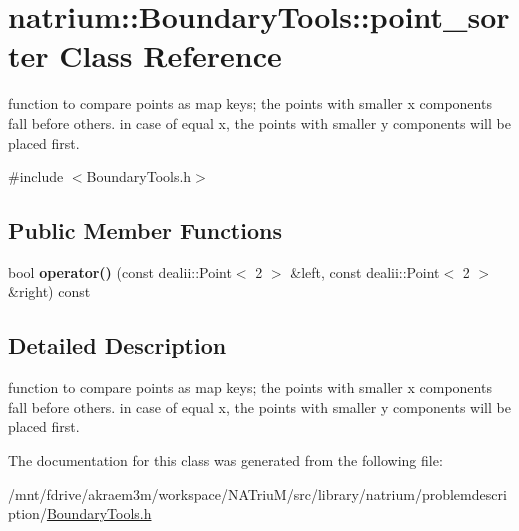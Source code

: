 \hypertarget{classnatrium_1_1BoundaryTools_1_1point__sorter}{
\section{natrium::BoundaryTools::point\_\-sorter Class Reference}
\label{classnatrium_1_1BoundaryTools_1_1point__sorter}
}


function to compare points as map keys; the points with smaller x components fall before others. in case of equal x, the points with smaller y components will be placed first.  


{\ttfamily \#include $<$BoundaryTools.h$>$}\subsection*{Public Member Functions}
\begin{DoxyCompactItemize}
\item 
\hypertarget{classnatrium_1_1BoundaryTools_1_1point__sorter_a38c2278eecae87f9a7350a78234b0433}{
bool {\bfseries operator()} (const dealii::Point$<$ 2 $>$ \&left, const dealii::Point$<$ 2 $>$ \&right) const }
\label{classnatrium_1_1BoundaryTools_1_1point__sorter_a38c2278eecae87f9a7350a78234b0433}

\end{DoxyCompactItemize}


\subsection{Detailed Description}
function to compare points as map keys; the points with smaller x components fall before others. in case of equal x, the points with smaller y components will be placed first. 

The documentation for this class was generated from the following file:\begin{DoxyCompactItemize}
\item 
/mnt/fdrive/akraem3m/workspace/NATriuM/src/library/natrium/problemdescription/\hyperlink{BoundaryTools_8h}{BoundaryTools.h}\end{DoxyCompactItemize}
